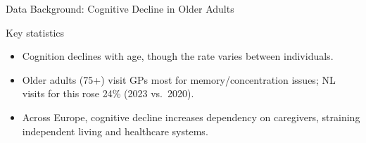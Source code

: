 \begin{frame}{Data Background: Cognitive Decline in Older Adults}
	\begin{block}{Key statistics}
		\begin{itemize}
			\item Cognition declines with age, though the rate varies between individuals\cite{lasa2025}.

			\item Older adults (75+) visit GPs most for memory/concentration issues; NL visits for this rose 24\% (2023 vs.\ 2020)\cite{rivm2023}.

			\item Across Europe, cognitive decline increases dependency on caregivers, straining independent living and healthcare systems\cite{formanek2019}.
		\end{itemize}
	\end{block}
\end{frame}
